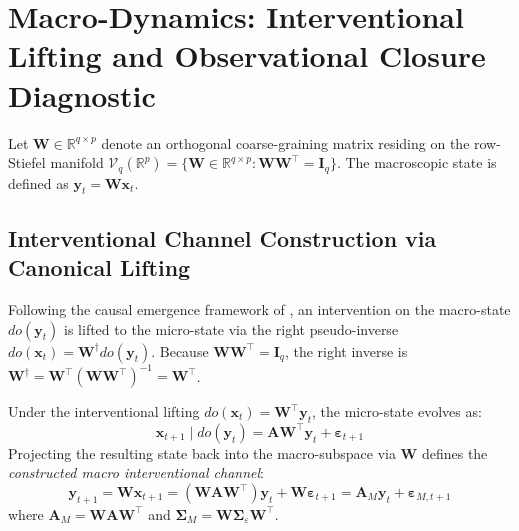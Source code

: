 \documentclass[12pt]{article}
\begin{document}
\section{Macro-Dynamics: Interventional Lifting and Observational Closure Diagnostic}
\label{app:macro_closure}

Let $\mathbf{W} \in \mathbb{R}^{q \times p}$ denote an orthogonal coarse-graining matrix residing on the row-Stiefel manifold $\mathcal{V}_q(\mathbb{R}^p) = \{ \mathbf{W} \in \mathbb{R}^{q \times p} : \mathbf{W}\mathbf{W}^\top = \mathbf{I}_q \}$. The macroscopic state is defined as $\mathbf{y}_t = \mathbf{W}\mathbf{x}_t$.

\subsection{Interventional Channel Construction via Canonical Lifting}
Following the causal emergence framework of \citet{liu2024exact}, an intervention on the macro-state $do(\mathbf{y}_t)$ is lifted to the micro-state via the right pseudo-inverse $do(\mathbf{x}_t) = \mathbf{W}^\dagger do(\mathbf{y}_t)$. Because $\mathbf{W}\mathbf{W}^\top = \mathbf{I}_q$, the right inverse is $\mathbf{W}^\dagger = \mathbf{W}^\top (\mathbf{W}\mathbf{W}^\top)^{-1} = \mathbf{W}^\top$.

Under the interventional lifting $do(\mathbf{x}_t) = \mathbf{W}^\top \mathbf{y}_t$, the micro-state evolves as:
\begin{equation}
\mathbf{x}_{t+1} \mid do(\mathbf{y}_t) = \mathbf{A} \mathbf{W}^\top \mathbf{y}_t + \boldsymbol{\varepsilon}_{t+1}
\end{equation}
Projecting the resulting state back into the macro-subspace via $\mathbf{W}$ defines the \emph{constructed macro interventional channel}:
\begin{equation}
\mathbf{y}_{t+1} = \mathbf{W}\mathbf{x}_{t+1} = (\mathbf{W}\mathbf{A}\mathbf{W}^\top)\mathbf{y}_t + \mathbf{W}\boldsymbol{\varepsilon}_{t+1} = \mathbf{A}_M \mathbf{y}_t + \boldsymbol{\varepsilon}_{M,t+1}
\end{equation}
where $\mathbf{A}_M = \mathbf{W}\mathbf{A}\mathbf{W}^\top$ and $\boldsymbol{\Sigma}_M = \mathbf{W}\boldsymbol{\Sigma}_\varepsilon \mathbf{W}^\top$.
\end{document}
